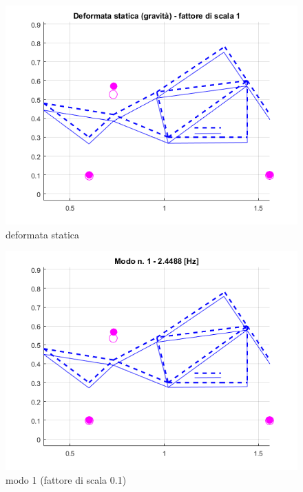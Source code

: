 \documentclass[12pt, a4paper]{article}
\begin{document}
	\begin{figure}[h]
		\centering
		\includegraphics[scale=0.6]{deformata_statica}
		\caption{deformata statica}
	\end{figure}
	\begin{figure}[h]
		\centering
		\includegraphics[scale=0.6]{modo_1}
		\caption{modo 1 (fattore di scala 0.1)}
	\end{figure}
\end{document}
